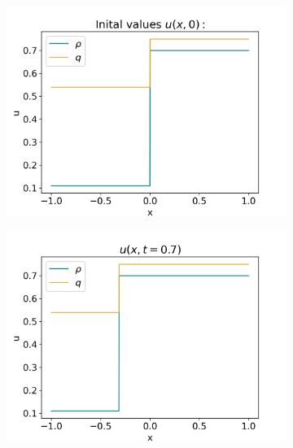 \documentclass[10pt]{article}
\numberwithin{equation}{section}
\begin{document}
\begin{figure}[H]
     \centering
     \begin{subfigure}[t]{0.35\textwidth}
         \centering
         \includegraphics[width=\textwidth]{Figures/Model/Plots/Sys2aIV.png}
     \end{subfigure}
     \begin{subfigure}[t]{0.35\textwidth}
         \centering
         \includegraphics[width=\textwidth]{Figures/Model/Plots/Sys2aAtTime.png}
     \end{subfigure}
     \hfill 
     \begin{subfigure}[b]{0.35\textwidth}
         \centering

\end{subfigure}
\end{figure}
\end{document}
